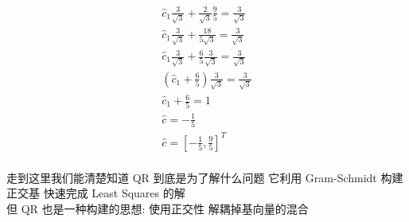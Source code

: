 \documentclass[12pt]{article}
\begin{document}
\begin{flushleft}
\begin{align}
        \hat{c}_{1}\frac{3}{\sqrt{3}} + \frac{2}{\sqrt{3}}\frac{9}{5} =  \frac{3}{\sqrt{3}}          \\
        \hat{c}_{1}\frac{3}{\sqrt{3}} +  \frac{18}{5\sqrt{3}} = \frac{3}{\sqrt{3}}                   \\
        \hat{c}_{1}\frac{3}{\sqrt{3}} +  \frac{6}{5} \frac{3}{\sqrt{3}} = \frac{3}{\sqrt{3}}         \\
        (\hat{c}_{1} + \frac{6}{5} )\frac{3}{\sqrt{3}} = \frac{3}{\sqrt{3}}                          \\
        \hat{c}_{1} + \frac{6}{5} = 1                                                                \\
        \hat{c} = -\frac{1}{5}                                                                       \\
        \hat{c} = [-\frac{1}{5}, \frac{9}{5}]^{T}                                                    \\
    \end{align}

    走到这里我们能清楚知道 QR 到底是为了解什么问题 它利用 Gram-Schmidt 构建正交基 快速完成 Least Squares 的解 \\
    但 QR 也是一种构建的思想: 使用正交性 解耦掉基向量的混合 \\



\end{flushleft}
\end{document}
